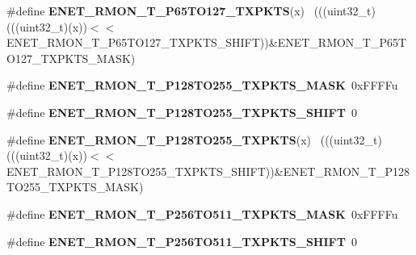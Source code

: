 \begin{DoxyCompactItemize}
\item 
\hypertarget{group___e_n_e_t___register___masks_ga5a901e239c8c2a6e8f45888ae8e806f4}{}\#define {\bfseries E\+N\+E\+T\+\_\+\+R\+M\+O\+N\+\_\+\+T\+\_\+\+P65\+T\+O127\+\_\+\+T\+X\+P\+K\+T\+S}(x)                  ~(((uint32\+\_\+t)(((uint32\+\_\+t)(x))$<$$<$E\+N\+E\+T\+\_\+\+R\+M\+O\+N\+\_\+\+T\+\_\+\+P65\+T\+O127\+\_\+\+T\+X\+P\+K\+T\+S\+\_\+\+S\+H\+I\+F\+T))\&E\+N\+E\+T\+\_\+\+R\+M\+O\+N\+\_\+\+T\+\_\+\+P65\+T\+O127\+\_\+\+T\+X\+P\+K\+T\+S\+\_\+\+M\+A\+S\+K)\label{group___e_n_e_t___register___masks_ga5a901e239c8c2a6e8f45888ae8e806f4}

\item 
\hypertarget{group___e_n_e_t___register___masks_gacd52bd7bd4b45906ad5f62ca31f3edda}{}\#define {\bfseries E\+N\+E\+T\+\_\+\+R\+M\+O\+N\+\_\+\+T\+\_\+\+P128\+T\+O255\+\_\+\+T\+X\+P\+K\+T\+S\+\_\+\+M\+A\+S\+K}~0x\+F\+F\+F\+Fu\label{group___e_n_e_t___register___masks_gacd52bd7bd4b45906ad5f62ca31f3edda}

\item 
\hypertarget{group___e_n_e_t___register___masks_ga6ff37e25aa7ff61367f6637d29189b89}{}\#define {\bfseries E\+N\+E\+T\+\_\+\+R\+M\+O\+N\+\_\+\+T\+\_\+\+P128\+T\+O255\+\_\+\+T\+X\+P\+K\+T\+S\+\_\+\+S\+H\+I\+F\+T}~0\label{group___e_n_e_t___register___masks_ga6ff37e25aa7ff61367f6637d29189b89}

\item 
\hypertarget{group___e_n_e_t___register___masks_ga55df8028aad8f57b846113c87ecc1bf5}{}\#define {\bfseries E\+N\+E\+T\+\_\+\+R\+M\+O\+N\+\_\+\+T\+\_\+\+P128\+T\+O255\+\_\+\+T\+X\+P\+K\+T\+S}(x)                ~(((uint32\+\_\+t)(((uint32\+\_\+t)(x))$<$$<$E\+N\+E\+T\+\_\+\+R\+M\+O\+N\+\_\+\+T\+\_\+\+P128\+T\+O255\+\_\+\+T\+X\+P\+K\+T\+S\+\_\+\+S\+H\+I\+F\+T))\&E\+N\+E\+T\+\_\+\+R\+M\+O\+N\+\_\+\+T\+\_\+\+P128\+T\+O255\+\_\+\+T\+X\+P\+K\+T\+S\+\_\+\+M\+A\+S\+K)\label{group___e_n_e_t___register___masks_ga55df8028aad8f57b846113c87ecc1bf5}

\item 
\hypertarget{group___e_n_e_t___register___masks_ga85bc090787f3d1078d6f9181f4bbb671}{}\#define {\bfseries E\+N\+E\+T\+\_\+\+R\+M\+O\+N\+\_\+\+T\+\_\+\+P256\+T\+O511\+\_\+\+T\+X\+P\+K\+T\+S\+\_\+\+M\+A\+S\+K}~0x\+F\+F\+F\+Fu\label{group___e_n_e_t___register___masks_ga85bc090787f3d1078d6f9181f4bbb671}

\item 
\hypertarget{group___e_n_e_t___register___masks_gae24403acde1f82a26d37e32743c259cf}{}\#define {\bfseries E\+N\+E\+T\+\_\+\+R\+M\+O\+N\+\_\+\+T\+\_\+\+P256\+T\+O511\+\_\+\+T\+X\+P\+K\+T\+S\+\_\+\+S\+H\+I\+F\+T}~0\label{group___e_n_e_t___register___masks_gae24403acde1f82a26d37e32743c259cf}


\end{DoxyCompactItemize}
